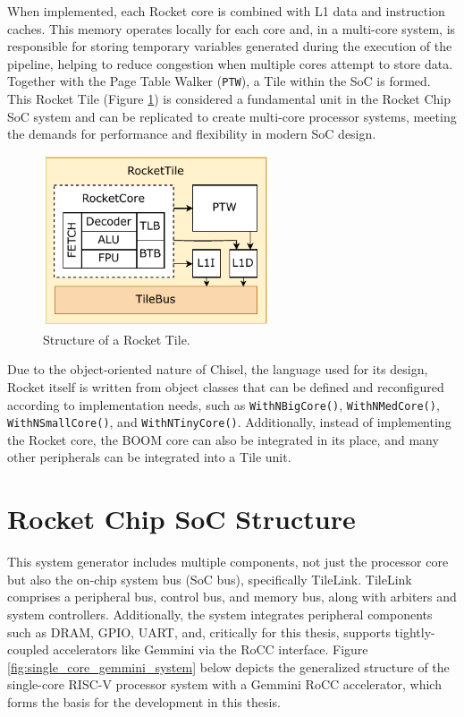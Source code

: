 When implemented, each Rocket core is combined with L1 data and instruction caches. This memory operates locally for each core and, in a multi-core system, is responsible for storing temporary variables generated during the execution of the pipeline, helping to reduce congestion when multiple cores attempt to store data. Together with the Page Table Walker (\texttt{PTW}), a Tile within the SoC is formed. This Rocket Tile (Figure \ref{fig:rocket_tile_structure}) is considered a fundamental unit in the Rocket Chip SoC system and can be replicated to create multi-core processor systems, meeting the demands for performance and flexibility in modern SoC design.

\begin{figure}[h!]
    \centering
    \includegraphics[width=0.6\textwidth]{Images/RocketTile_Basic.pdf}
    \caption{Structure of a Rocket Tile.}
    \label{fig:rocket_tile_structure}
\end{figure}

Due to the object-oriented nature of Chisel, the language used for its design, Rocket itself is written from object classes that can be defined and reconfigured according to implementation needs, such as \texttt{WithNBigCore()}, \texttt{WithNMedCore()}, \texttt{WithNSmallCore()}, and \texttt{WithNTinyCore()}. Additionally, instead of implementing the Rocket core, the BOOM core can also be integrated in its place, and many other peripherals can be integrated into a Tile unit.


\section{Rocket Chip SoC Structure}
\label{sec:rocketchip_soc_structure}

This system generator includes multiple components, not just the processor core but also the on-chip system bus (SoC bus), specifically TileLink. TileLink comprises a peripheral bus, control bus, and memory bus, along with arbiters and system controllers. Additionally, the system integrates peripheral components such as DRAM, GPIO, UART, and, critically for this thesis, supports tightly-coupled accelerators like Gemmini via the RoCC interface. Figure \ref{fig:single_core_gemmini_system} below depicts the generalized structure of the single-core RISC-V processor system with a Gemmini RoCC accelerator, which forms the basis for the development in this thesis.

